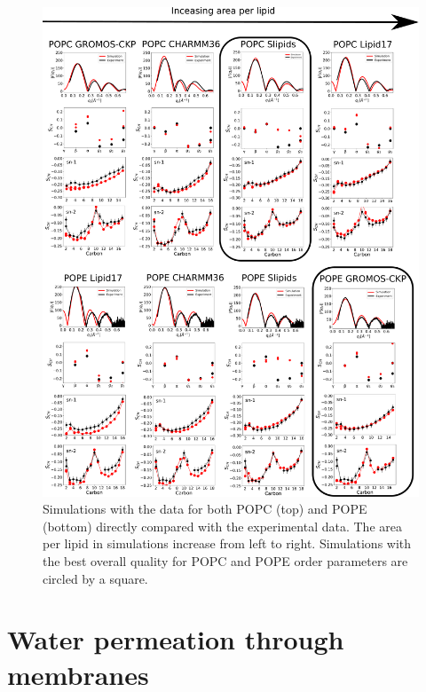 \documentclass[fleqn,10pt]{wlscirep}
\begin{document}
\begin{figure}[!h]
    \centering
    \includegraphics[width = 140mm]{Figures/POPC_POPE_dataSI.pdf}
    \caption{Simulations with the data for both POPC (top) and POPE (bottom) directly compared with the experimental data.
      The area per lipid in simulations increase from left to right.
      Simulations with the best overall quality for POPC and POPE order parameters are circled by a square.
  }
    \label{fig:POPC_POPE_dataSI}
\end{figure}


\pagebreak
\section{Water permeation through membranes}
\end{document}
